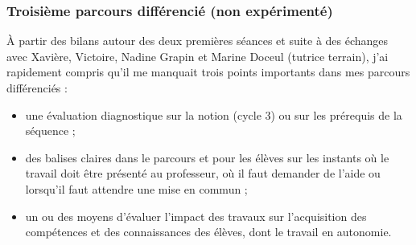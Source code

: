 \subsubsection{Troisième parcours différencié (non expérimenté)}
À partir des bilans autour des deux premières séances et suite à des échanges avec Xavière, Victoire, Nadine Grapin et Marine Doceul (tutrice terrain), j'ai rapidement compris qu'il me manquait trois points importants dans mes parcours différenciés :
\begin{itemize}
	\item une évaluation diagnostique sur la notion (cycle 3) ou sur les prérequis de la séquence ;
	\item des balises claires dans le parcours et pour les élèves sur les instants où le travail doit être présenté au professeur, où il faut demander de l'aide ou lorsqu'il faut attendre une mise en commun ;
	\item un ou des moyens d'évaluer l'impact des travaux sur l'acquisition des compétences et des connaissances des élèves, dont le travail en autonomie.
\end{itemize}
